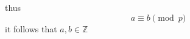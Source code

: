 \documentclass{article}
\begin{document}
thus \[a \equiv b \pmod{p}\]
it follows that \(a,b\in\mathbb{Z}\)
\end{document}
